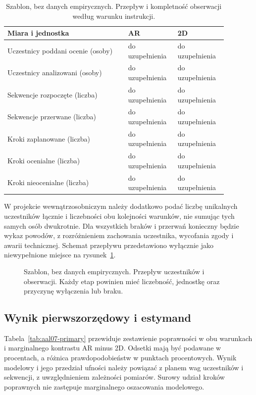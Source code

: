 \documentclass[11pt,a4paper]{article}
\begin{document}
\begin{table}[htbp]
\centering
\small
\caption{Szablon, bez danych empirycznych. Przepływ i kompletność obserwacji według warunku instrukcji.}
\label{tab:aal07-flow}
\begin{tabular}{p{0.50\linewidth}p{0.19\linewidth}p{0.19\linewidth}}
\hline
Miara i jednostka & AR & 2D \\
\hline
Uczestnicy poddani ocenie (osoby) & do uzupełnienia & do uzupełnienia \\
Uczestnicy analizowani (osoby) & do uzupełnienia & do uzupełnienia \\
Sekwencje rozpoczęte (liczba) & do uzupełnienia & do uzupełnienia \\
Sekwencje przerwane (liczba) & do uzupełnienia & do uzupełnienia \\
Kroki zaplanowane (liczba) & do uzupełnienia & do uzupełnienia \\
Kroki ocenialne (liczba) & do uzupełnienia & do uzupełnienia \\
Kroki nieocenialne (liczba) & do uzupełnienia & do uzupełnienia \\
\hline
\end{tabular}
\end{table}

W projekcie wewnątrzosobniczym należy dodatkowo podać liczbę unikalnych uczestników łącznie i liczebności obu kolejności warunków, nie sumując tych samych osób dwukrotnie. Dla wszystkich braków i przerwań konieczny będzie wykaz powodów, z rozróżnieniem zachowania uczestnika, wycofania zgody i awarii technicznej. Schemat przepływu przedstawiono wyłącznie jako niewypełnione miejsce na rysunek~\ref{fig:aal07-flow}.

\begin{figure}[htbp]
\centering
{}
\caption{Szablon, bez danych empirycznych. Przepływ uczestników i obserwacji. Każdy etap powinien mieć liczebność, jednostkę oraz przyczynę wyłączenia lub braku.}
\label{fig:aal07-flow}
\end{figure}

\subsection{Wynik pierwszorzędowy i estymand}
Tabela~\ref{tab:aal07-primary} przewiduje zestawienie poprawności w obu warunkach i marginalnego kontrastu AR minus 2D. Odsetki mają być podawane w procentach, a różnica prawdopodobieństw w punktach procentowych. Wynik modelowy i jego przedział ufności należy powiązać z planem wag uczestników i sekwencji, z uwzględnieniem zależności pomiarów. Surowy udział kroków poprawnych nie zastępuje marginalnego oszacowania modelowego.
\end{document}
